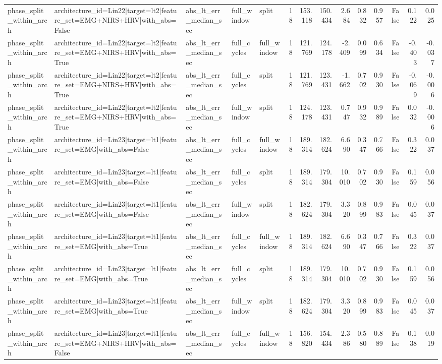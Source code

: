 \begin{table}
\begin{tabular}{lllllrrrrrrrrr}
phase_split_within_arch & architecture_id=Lin22|target=lt2|feature_set=EMG+NIRS+HRV|with_abs=False & abs_lt_err_median_sec & full_window & split & 18 & 153.118 & 150.434 & 2.684 & 0.832 & 0.957 & False & 0.122 & 0.025 \\
phase_split_within_arch & architecture_id=Lin22|target=lt2|feature_set=EMG+NIRS+HRV|with_abs=True & abs_lt_err_median_sec & full_cycles & full_window & 18 & 121.769 & 124.178 & -2.409 & 0.099 & 0.634 & False & -0.403 & -0.037 \\
phase_split_within_arch & architecture_id=Lin22|target=lt2|feature_set=EMG+NIRS+HRV|with_abs=True & abs_lt_err_median_sec & full_cycles & split & 18 & 121.769 & 123.431 & -1.662 & 0.702 & 0.930 & False & -0.069 & -0.006 \\
phase_split_within_arch & architecture_id=Lin22|target=lt2|feature_set=EMG+NIRS+HRV|with_abs=True & abs_lt_err_median_sec & full_window & split & 18 & 124.178 & 123.431 & 0.747 & 0.932 & 0.989 & False & 0.032 & -0.006 \\
phase_split_within_arch & architecture_id=Lin23|target=lt1|feature_set=EMG|with_abs=False & abs_lt_err_median_sec & full_cycles & full_window & 18 & 189.314 & 182.624 & 6.690 & 0.347 & 0.766 & False & 0.322 & 0.037 \\
phase_split_within_arch & architecture_id=Lin23|target=lt1|feature_set=EMG|with_abs=False & abs_lt_err_median_sec & full_cycles & split & 18 & 189.314 & 179.304 & 10.010 & 0.702 & 0.930 & False & 0.159 & 0.056 \\
phase_split_within_arch & architecture_id=Lin23|target=lt1|feature_set=EMG|with_abs=False & abs_lt_err_median_sec & full_window & split & 18 & 182.624 & 179.304 & 3.320 & 0.899 & 0.983 & False & 0.045 & 0.037 \\
phase_split_within_arch & architecture_id=Lin23|target=lt1|feature_set=EMG|with_abs=True & abs_lt_err_median_sec & full_cycles & full_window & 18 & 189.314 & 182.624 & 6.690 & 0.347 & 0.766 & False & 0.322 & 0.037 \\
phase_split_within_arch & architecture_id=Lin23|target=lt1|feature_set=EMG|with_abs=True & abs_lt_err_median_sec & full_cycles & split & 18 & 189.314 & 179.304 & 10.010 & 0.702 & 0.930 & False & 0.159 & 0.056 \\
phase_split_within_arch & architecture_id=Lin23|target=lt1|feature_set=EMG|with_abs=True & abs_lt_err_median_sec & full_window & split & 18 & 182.624 & 179.304 & 3.320 & 0.899 & 0.983 & False & 0.045 & 0.037 \\
phase_split_within_arch & architecture_id=Lin23|target=lt1|feature_set=EMG+NIRS+HRV|with_abs=False & abs_lt_err_median_sec & full_cycles & full_window & 18 & 156.820 & 154.434 & 2.386 & 0.580 & 0.889 & False & 0.138 & 0.019 \\

\end{tabular}
\end{table}
